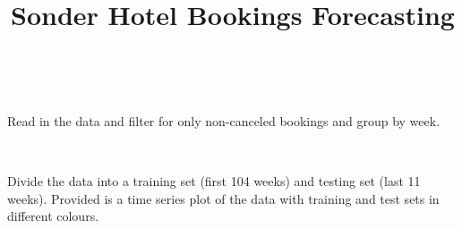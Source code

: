 \documentclass[]{article}
\title{Sonder Hotel Bookings Forecasting}
\author{}
\date{}
\newenvironment{Shaded}{\begin{snugshade}}{\end{snugshade}}
\newcommand{\DataTypeTok}[1]{\textcolor[rgb]{0.13,0.29,0.53}{#1}}
\newcommand{\DecValTok}[1]{\textcolor[rgb]{0.00,0.00,0.81}{#1}}
\newcommand{\KeywordTok}[1]{\textcolor[rgb]{0.13,0.29,0.53}{\textbf{#1}}}
\newcommand{\NormalTok}[1]{#1}
\newcommand{\OperatorTok}[1]{\textcolor[rgb]{0.81,0.36,0.00}{\textbf{#1}}}
\newcommand{\OtherTok}[1]{\textcolor[rgb]{0.56,0.35,0.01}{#1}}
\newcommand{\StringTok}[1]{\textcolor[rgb]{0.31,0.60,0.02}{#1}}
\begin{document}
\maketitle

\(\;\) \(\;\)

Read in the data and filter for only non-canceled bookings and group by
week.

\begin{Shaded}
\end{Shaded}

\(\;\)

Divide the data into a training set (first 104 weeks) and testing set
(last 11 weeks). Provided is a time series plot of the data with
training and test sets in different colours.
\end{document}
